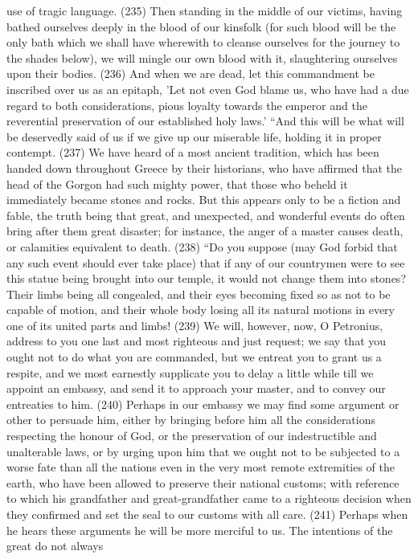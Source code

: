 use of tragic language. (235) Then standing in the middle of our victims, having bathed ourselves
deeply in the blood of our kinsfolk (for such blood will be the only bath which we shall have
wherewith to cleanse ourselves for the journey to the shades below), we will mingle our own blood
with it, slaughtering ourselves upon their bodies. (236) And when we are dead, let this
commandment be inscribed over us as an epitaph, 'Let not even God blame us, who have had a
due regard to both considerations, pious loyalty towards the emperor and the reverential
preservation of our established holy laws.' ``And this will be what will be deservedly said of us if we
give up our miserable life, holding it in proper contempt. (237) We have heard of a most ancient
tradition, which has been handed down throughout Greece by their historians, who have affirmed
that the head of the Gorgon had such mighty power, that those who beheld it immediately became
stones and rocks. But this appears only to be a fiction and fable, the truth being that great, and
unexpected, and wonderful events do often bring after them great disaster; for instance, the anger
of a master causes death, or calamities equivalent to death. (238) ``Do you suppose (may God
forbid that any such event should ever take place) that if any of our countrymen were to see this
statue being brought into our temple, it would not change them into stones? Their limbs being all
congealed, and their eyes becoming fixed so as not to be capable of motion, and their whole body
losing all its natural motions in every one of its united parts and limbs! (239) We will, however, now,
O Petronius, address to you one last and most righteous and just request; we say that you ought
not to do what you are commanded, but we entreat you to grant us a respite, and we most
earnestly supplicate you to delay a little while till we appoint an embassy, and send it to approach
your master, and to convey our entreaties to him. (240) Perhaps in our embassy we may find
some argument or other to persuade him, either by bringing before him all the considerations
respecting the honour of God, or the preservation of our indestructible and unalterable laws, or by
urging upon him that we ought not to be subjected to a worse fate than all the nations even in the
very most remote extremities of the earth, who have been allowed to preserve their national
customs; with reference to which his grandfather and great-grandfather came to a righteous
decision when they confirmed and set the seal to our customs with all care. (241) Perhaps when
he hears these arguments he will be more merciful to us. The intentions of the great do not always
